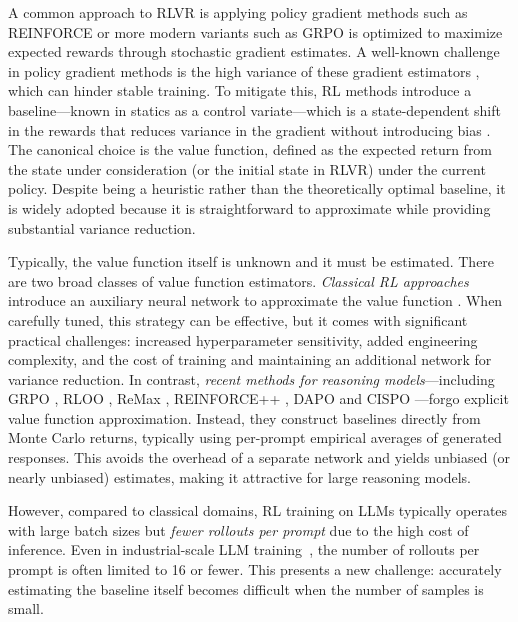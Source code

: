 \documentclass{article}
\theoremstyle{plain}
\theoremstyle{definition}
\theoremstyle{remark}
\begin{document}
  A common approach to RLVR is applying policy gradient methods such as REINFORCE \citep{williams1992simple} or more modern variants such as GRPO \citep{shao2024deepseekmath} is optimized to maximize expected rewards through stochastic gradient estimates. A well-known challenge in policy gradient methods is the high variance of these gradient estimators  \citep{SuttonBarto2018-AC}, which can hinder stable training. To mitigate this, RL methods introduce a baseline---known in statics as a control variate---which is a state-dependent shift in the rewards that reduces variance in the gradient without introducing bias \citep{sutton1998reinforcement,greensmith2004variance}. The canonical choice is the value function, defined as the expected return from the state under consideration (or the initial state in RLVR) under the current policy. Despite being a heuristic rather than the theoretically optimal baseline, it is widely adopted \citep{SuttonBarto2018-AC} because it is straightforward to approximate while providing substantial variance reduction.
  
  Typically, the value function itself is unknown and it must be estimated.
  There are two broad classes of value function estimators. \emph{Classical RL approaches} introduce an auxiliary neural network to approximate the value function \citep{barto1989learning, mnih2016asynchronous, haarnoja2018soft, schulman2015trust, schulman2017proximal}. When carefully tuned, this strategy can be effective, but it comes with significant practical challenges: increased hyperparameter sensitivity, added engineering complexity, and the cost of training and maintaining an additional network for variance reduction. In contrast, \emph{recent methods for reasoning models}—including GRPO \citep{shao2024deepseekmath}, RLOO \citep{ahmadian2024back}, ReMax \citep{li2023remax}, REINFORCE++ \citep{hu2025reinforce++}, DAPO \citep{yu2025dapo} and CISPO \citep{minimax2025minimaxm1scalingtesttimecompute}—forgo explicit value function approximation. Instead, they construct baselines directly from Monte Carlo returns, typically using per-prompt empirical averages of generated responses. This avoids the overhead of a separate network and yields unbiased (or nearly unbiased) estimates, making it attractive for large reasoning models. 
  
  However, compared to classical domains, RL training on LLMs typically operates with large batch sizes but \emph{fewer rollouts per prompt} due to the high cost of inference. Even in industrial-scale LLM training~\citep{guo2025deepseek,deepseekai2025deepseekv32pushingfrontieropen}, the number of rollouts per prompt is often limited to 16 or fewer. This presents a new challenge: accurately estimating the baseline itself becomes difficult when the number of samples is small. 
  
\end{document}
